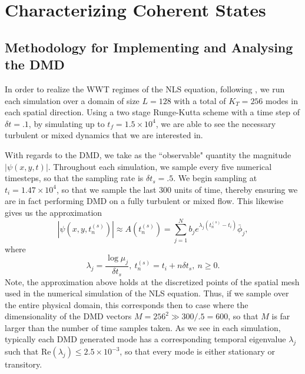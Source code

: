 \documentclass[a4paper,11pt]{article}
\begin{document}
\section*{Characterizing Coherent States}

\subsection*{Methodology for Implementing and Analysing the DMD}

In order to realize the WWT regimes of the NLS equation, following \cite{nazarenko2}, we run each simulation over a domain of size $L=128$ with a total of $K_{T}=256$ modes in each spatial direction.  Using a two stage Runge-Kutta scheme with a time step of $\delta t=.1$, by simulating up to $t_{f}=1.5\times 10^{4}$, we are able to see the necessary turbulent or mixed dynamics that we are interested in.  

With regards to the DMD, we take as the ``observable" quantity the magnitude $|\psi(x,y,t)|$.  Throughout each simulation, we sample every five numerical timesteps, so that the sampling rate is $\delta t_{s}=.5$.  We begin sampling at $t_{i}=1.47\times10^{4}$, so that we sample the last $300$ units of time, thereby ensuring we are in fact performing DMD on a fully turbulent or mixed flow.  This likewise gives us the approximation
\[
|\psi(x,y,t^{(s)}_{n})| \approx A\left(t^{(s)}_{n}\right) = \sum_{j=1}^{N} b_{j}e^{\lambda_{j}(t^{(s)}_{n}-t_{i})} \bar{\phi}_{j},  
\]
where
\[
\lambda_{j} = \frac{\log \mu_{j}}{\delta t_{s}}, ~ t^{(s)}_{n} = t_{i}  + n\delta t_{s}, ~ n\geq 0.
\]
Note, the approximation above holds at the discretized points of the spatial mesh used in the numerical simulation of the NLS equation.  Thus, if we sample over the entire physical domain, this corresponds then to case where the dimensionality of the DMD vectors $M = 256^2 \gg 300/.5 = 600$, so that $M$ is far larger than the number of time samples taken.  As we see in each simulation, typically each DMD generated mode has a corresponding temporal eigenvalue $\lambda_{j}$ such that $\mbox{Re}\left(\lambda_{j}\right)\leq 2.5\times 10^{-3}$, so that every mode is either stationary or transitory.  
\end{document}
